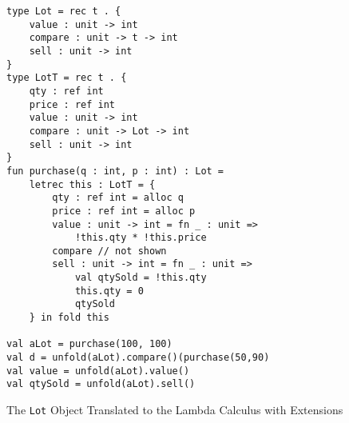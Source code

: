 \begin{figure}
  \centering
\begin{lstlisting}
type Lot = rec t . {
	value : unit -> int
	compare : unit -> t -> int
	sell : unit -> int
}
type LotT = rec t . {
	qty : ref int
	price : ref int
	value : unit -> int
	compare : unit -> Lot -> int
	sell : unit -> int
}
fun purchase(q : int, p : int) : Lot =
	letrec this : LotT = {
		qty : ref int = alloc q
		price : ref int = alloc p
		value : unit -> int = fn _ : unit =>
			!this.qty * !this.price
		compare // not shown
		sell : unit -> int = fn _ : unit =>
			val qtySold = !this.qty
			this.qty = 0
			qtySold
	} in fold this
	
val aLot = purchase(100, 100)
val d = unfold(aLot).compare()(purchase(50,90)
val value = unfold(aLot).value()
val qtySold = unfold(aLot).sell()
\end{lstlisting}
\caption{The \texttt{Lot} Object Translated to the Lambda Calculus with Extensions}
\label{f-core2-example-translation}
\end{figure}
